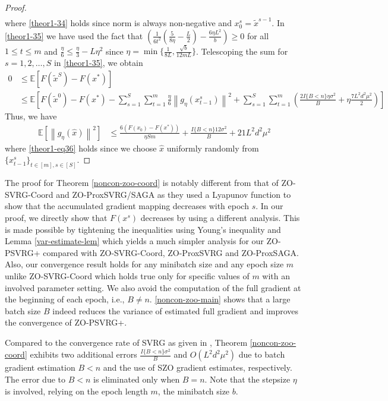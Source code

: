 \documentclass{article}
\newcommand*{\E}{\mathbb{E}}
\newcommand{\norm}[1]{\left\lVert#1\right\rVert}
\theoremstyle{definition}
\theoremstyle{remark}
\begin{document}
\begin{proof}
\begin{align}
 \end{align}
 where \eqref{theor1-34} holds since norm is always non-negative and $x_0^s = \tilde{x}^{s-1}$. In \eqref{theor1-35} we have used the fact that $(\frac{1}{6t^2}(\frac{5}{8\eta} - \frac{L}{2})-\frac{6\eta L^2 }{b})\geq 0$ for all $1\leq t \leq m$ and $\frac{\eta}{6} \leq \frac{\eta}{3}-L\eta^2$ since $\eta = \min\{\frac{1}{8L}, \frac{\sqrt{b}}{12 mL}\}$. 
 Telescoping the sum for $s = 1, 2, \ldots, S$ in \eqref{theor1-35}, we obtain
 \begin{equation*}
\begin{split} 
0 &\leq \E[F(\tilde{x}^S) - F({x}^*)] \\
&\leq \E\left[F(\tilde{x}^{0}) - F({x}^*) - \sum_{s=1}^S\sum_{t=1}^m\frac{\eta}{6}\norm{g_{\eta}(x_{t-1}^s)}^2 + \sum_{s=1}^S\sum_{t=1}^m(\frac{2I\{B < n\}\eta \sigma ^2}{B}+\eta \frac{7 L^2 d^2 \mu^2}{2})\right]
 \end{split}
 \end{equation*}
 Thus, we have
  \begin{align}
\E[\norm{g_{\eta}(\hat{x})}^2] & \leq \frac{6\left(F(x_0) - F({x}^*)\right)}{\eta Sm} + \frac{I\{B < n\}12\sigma ^2}{B}+21{L^2 d^2 \mu^2}\label{theor1-eq36}
 \end{align}
 where \eqref{theor1-eq36} holds since we choose  $\hat{x}$ uniformly randomly from $\{x_{t-1}^s\}_{t\in [m], s\in [S]}$. 
\end{proof} 
{\color{Violet}
The proof for Theorem \ref{noncon-zoo-coord} is notably different from that of ZO-SVRG-Coord and ZO-ProxSVRG/SAGA as they used a Lyapunov function to show that the accumulated gradient mapping decreases with epoch $s$. In our proof, we directly show that $F(x^s)$ decreases by  using a different analysis. This is made possible by tightening the inequalities using Young's inequality and Lemma \ref{var-estimate-lem} which yields a much simpler analysis for our ZO-PSVRG+ compared with ZO-SVRG-Coord, ZO-ProxSVRG and ZO-ProxSAGA.  Also, our convergence result holds for any minibatch size and any epoch size $m$ unlike ZO-SVRG-Coord which holds true only for specific values of $m$ with an involved parameter setting.
We also avoid the computation of the full gradient at the beginning of each epoch, i.e., $B \neq n$.
} \eqref{noncon-zoo-main} shows that a large batch size $B$ indeed reduces the variance of estimated full gradient and improves the convergence of ZO-PSVRG+.
 
{\color{Brown}
Compared to the convergence rate of SVRG as given in \cite{reddi2016proximal}, Theorem \ref{noncon-zoo-coord} exhibits two
additional errors $\frac{I\{B < n\}\sigma ^2}{B}$ and $O(L^2d^2\mu^2)$ due to batch gradient estimation $B < n$ and the use of SZO gradient estimates, respectively. The error due to $B < n$ is eliminated only when $B = n$. 
Note that the stepsize  $\eta$ is involved, relying on the epoch length $m$, the minibatch size $b$. 
}
\end{document}
